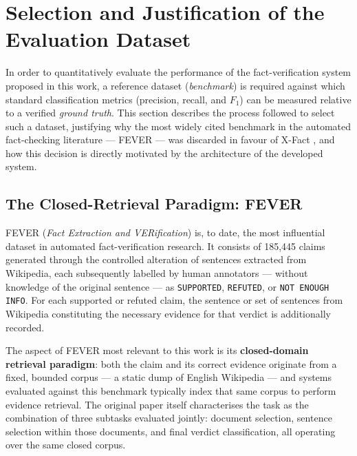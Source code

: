 
\section{Selection and Justification of the Evaluation Dataset}
\label{sec:dataset-selection}

In order to quantitatively evaluate the performance of the
fact-verification system proposed in this work, a reference dataset
(\textit{benchmark}) is required against which standard
classification metrics (precision, recall, and $F_1$) can be
measured relative to a verified \textit{ground truth}. This section
describes the process followed to select such a dataset, justifying
why the most widely cited benchmark in the automated fact-checking
literature --- FEVER \cite{thorne2018fever} --- was discarded in
favour of X-Fact \cite{gupta2021xfact}, and how this decision is
directly motivated by the architecture of the developed system.

\subsection{The Closed-Retrieval Paradigm: FEVER}
\label{subsec:fever}

FEVER (\textit{Fact Extraction and VERification}) \cite{thorne2018fever}
is, to date, the most influential dataset in automated
fact-verification research. It consists of 185,445 claims generated
through the controlled alteration of sentences extracted from
Wikipedia, each subsequently labelled by human annotators ---
without knowledge of the original sentence --- as
\texttt{SUPPORTED}, \texttt{REFUTED}, or \texttt{NOT ENOUGH INFO}.
For each supported or refuted claim, the sentence or set of
sentences from Wikipedia constituting the necessary evidence for
that verdict is additionally recorded.

The aspect of FEVER most relevant to this work is its
\textbf{closed-domain retrieval paradigm}: both the claim and its
correct evidence originate from a fixed, bounded corpus --- a static
dump of English Wikipedia --- and systems evaluated against this
benchmark typically index that same corpus to perform evidence
retrieval. The original paper itself characterises the task as the
combination of three subtasks evaluated jointly: document selection,
sentence selection within those documents, and final verdict
classification, all operating over the same closed corpus.

